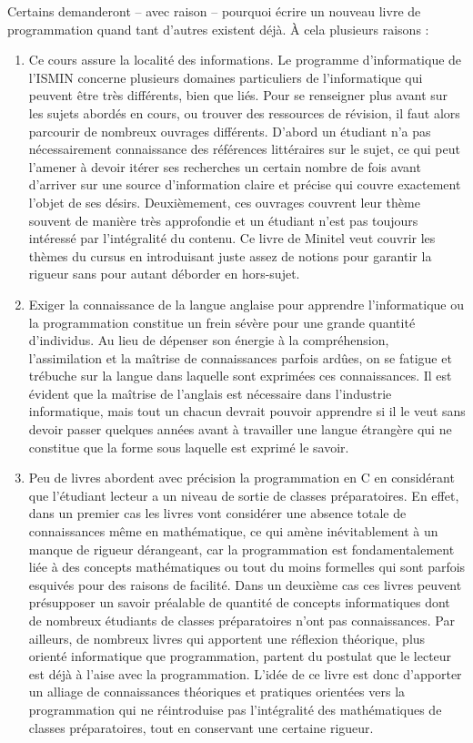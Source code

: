 \documentclass[../main.tex]{subfiles}
\begin{document}
Certains demanderont -- avec raison -- pourquoi écrire un nouveau livre de programmation quand tant d'autres existent déjà. À cela plusieurs raisons :
\begin{enumerate}
	\item Ce cours assure la localité des informations. Le programme d'informatique de l'ISMIN concerne plusieurs domaines particuliers de l'informatique qui peuvent être très différents, bien que liés. Pour se renseigner plus avant sur les sujets abordés en cours, ou trouver des ressources de révision, il faut alors parcourir de nombreux ouvrages différents. D'abord un étudiant n'a pas nécessairement connaissance des références littéraires sur le sujet, ce qui peut l'amener à devoir itérer ses recherches un certain nombre de fois avant d'arriver sur une source d'information claire et précise qui couvre exactement l'objet de ses désirs. Deuxièmement, ces ouvrages couvrent leur thème souvent de manière très approfondie et un étudiant n'est pas toujours intéressé par l'intégralité du contenu. Ce livre de Minitel veut couvrir les thèmes du cursus en introduisant juste assez de notions pour garantir la rigueur sans pour autant déborder en hors-sujet.
	\item Exiger la connaissance de la langue anglaise pour apprendre l'informatique ou la programmation constitue un frein sévère pour une grande quantité d'individus. Au lieu de dépenser son énergie à la compréhension, l'assimilation et la maîtrise de connaissances parfois ardûes, on se fatigue et trébuche sur la langue dans laquelle sont exprimées ces connaissances. Il est évident que la maîtrise de l'anglais est nécessaire dans l'industrie informatique, mais tout un chacun devrait pouvoir apprendre si il le veut sans devoir passer quelques années avant à travailler une langue étrangère qui ne constitue que la forme sous laquelle est exprimé le savoir.
	\item Peu de livres abordent avec précision la programmation en C en considérant que l'étudiant lecteur a un niveau de sortie de classes préparatoires. En effet, dans un premier cas les livres vont considérer une absence totale de connaissances même en mathématique, ce qui amène inévitablement à un manque de rigueur dérangeant, car la programmation est fondamentalement liée à des concepts mathématiques ou tout du moins formelles qui sont parfois esquivés pour des raisons de facilité. Dans un deuxième cas ces livres peuvent présupposer un savoir préalable de quantité de concepts informatiques dont de nombreux étudiants de classes préparatoires n'ont pas connaissances. Par ailleurs, de nombreux livres qui apportent une réflexion théorique, plus orienté informatique que programmation, partent du postulat que le lecteur est déjà à l'aise avec la programmation. L'idée de ce livre est donc d'apporter un alliage de connaissances théoriques et pratiques orientées vers la programmation qui ne réintroduise pas l'intégralité des mathématiques de classes préparatoires, tout en conservant une certaine rigueur.

\end{enumerate}
\end{document}
